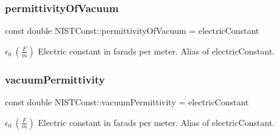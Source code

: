 \subsubsection{\texorpdfstring{permittivity\+Of\+Vacuum}{permittivityOfVacuum}}
{\footnotesize\ttfamily const double N\+I\+S\+T\+Const\+::permittivity\+Of\+Vacuum = electric\+Constant}

$\epsilon_0 \ (\frac{F}{m})$ Electric constant in farads per meter. Alias of electric\+Constant. \mbox{\label{group___electric_constant_ga46294f940b4149602e7bef336431c7dd}} 
\subsubsection{\texorpdfstring{vacuum\+Permittivity}{vacuumPermittivity}}
{\footnotesize\ttfamily const double N\+I\+S\+T\+Const\+::vacuum\+Permittivity = electric\+Constant}

$\epsilon_0 \ (\frac{F}{m})$ Electric constant in farads per meter. Alias of electric\+Constant. 